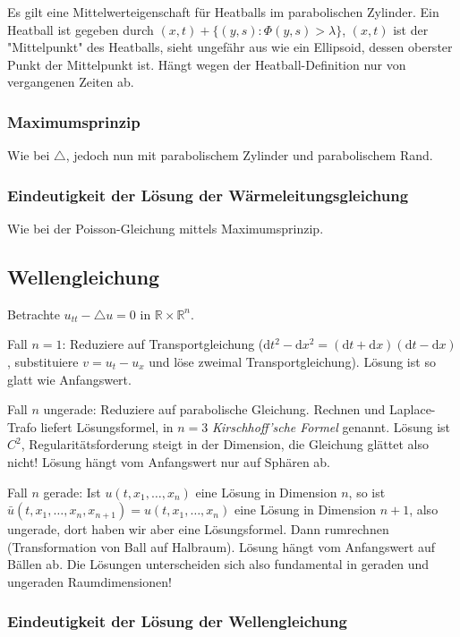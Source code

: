 \documentclass[11pt,a4paper]{scrartcl}
\newcommand{\R}{\mathbb{R}} %
\theoremstyle{plain}
\theoremstyle{definition}
\theoremstyle{remark}
\begin{document}
Es gilt eine Mittelwerteigenschaft für Heatballs im parabolischen Zylinder. Ein Heatball ist gegeben durch $(x,t) + \{(y,s): \Phi(y,s) > \lambda\}$, $(x,t)$ ist der "Mittelpunkt" des Heatballs, sieht ungefähr aus wie ein Ellipsoid, dessen oberster Punkt der Mittelpunkt ist. Hängt wegen der Heatball-Definition nur von vergangenen Zeiten ab.

\subsubsection{Maximumsprinzip}

Wie bei $\triangle$, jedoch nun mit parabolischem Zylinder und parabolischem Rand.

\subsubsection{Eindeutigkeit der Lösung der Wärmeleitungsgleichung}

Wie bei der Poisson-Gleichung mittels Maximumsprinzip.

\subsection{Wellengleichung}

Betrachte $u_{tt}-\triangle u = 0$ in $\R\times \R^n$. 

Fall $n=1$: Reduziere auf Transportgleichung ($\mathrm{d}t^2-\mathrm{d}x^2=(\mathrm{d}t+\mathrm{d}x)(\mathrm{d}t-\mathrm{d}x)$, substituiere $v=u_t-u_x$ und löse zweimal Transportgleichung). Lösung ist so glatt wie Anfangswert. 

Fall $n$ ungerade: Reduziere auf parabolische Gleichung. Rechnen und Laplace-Trafo liefert Lösungsformel, in $n=3$ \emph{Kirschhoff'sche Formel} genannt. Lösung ist $C^2$, Regularitätsforderung steigt in der Dimension, die Gleichung glättet also nicht! Lösung hängt vom Anfangswert nur auf Sphären ab. 

Fall $n$ gerade: Ist $u(t,x_1,\dots,x_n)$ eine Lösung in Dimension $n$, so ist $\bar u(t,x_1,\dots,x_n,x_{n+1})=u(t,x_1,\dots,x_n)$ eine Lösung in Dimension $n+1$, also ungerade, dort haben wir aber eine Lösungsformel. Dann rumrechnen (Transformation von Ball auf Halbraum). Lösung hängt vom Anfangswert auf Bällen ab. Die Lösungen unterscheiden sich also fundamental in geraden und ungeraden Raumdimensionen!

\subsubsection{Eindeutigkeit der Lösung der Wellengleichung}
\end{document}
